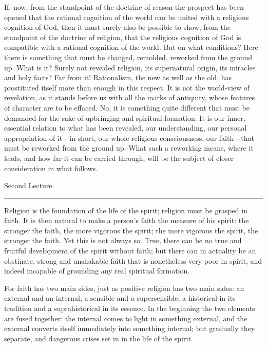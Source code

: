 \documentclass[12pt,a4paper,openany]{book}
\newcommand{\opage}[1]{\marginnote{\footnotesize\textit{[#1]}}}
\newcommand{\lecture}[1]{\clearpage\begin{center}{\large #1}\\[0.4em]\rule{3em}{0.4pt}\end{center}\medskip\noindent}
\begin{document}
If, now, from the standpoint of the doctrine of reason the prospect has
been opened that the rational cognition of the world can be united with a
religious cognition of God, then it must surely also be possible to show,
from the standpoint of the doctrine of religion, that the religious
cognition of God is compatible with a rational cognition of the world.
But on what conditions? Here there is something that must be changed,
\opage{16}remolded, reworked from the ground up. What is it? Surely not revealed
religion, its supernatural origin, its miracles and holy facts? Far from
it! Rationalism, the new as well as the old, has prostituted itself more
than enough in this respect. It is not the world-view of revelation, as
it stands before us with all the marks of antiquity, whose features of
character are to be effaced. No, it is something quite different that
must be demanded for the sake of upbringing and spiritual formation. It
is our inner, essential relation to what has been revealed, our
understanding, our personal appropriation of it---in short, our whole
religious consciousness, our faith---that must be reworked from the
ground up. What such a reworking means, where it leads, and how far it
can be carried through, will be the subject of closer consideration in
what follows.

\lecture{Second Lecture.}
\opage{17}Religion is the foundation of the life of the spirit; religion must be
grasped in faith. It is then natural to make a person's faith the
measure of his spirit: the stronger the faith, the more vigorous the
spirit; the more vigorous the spirit, the stronger the faith. Yet this
is not always so. True, there can be no true and fruitful development of
the spirit without faith; but there can in actuality be an obstinate,
strong and unshakable faith that is nonetheless very poor in spirit, and
indeed incapable of grounding any real spiritual formation.

For faith has two main sides, just as positive religion has two main
sides: an external and an internal, a sensible and a supersensible, a
historical in its tradition and a suprahistorical in its essence. In the
beginning the two elements are fused together: the internal comes to
light in something external, and the external converts itself
immediately into something internal; but gradually they separate, and
dangerous crises set in in the life of the spirit.
\end{document}
